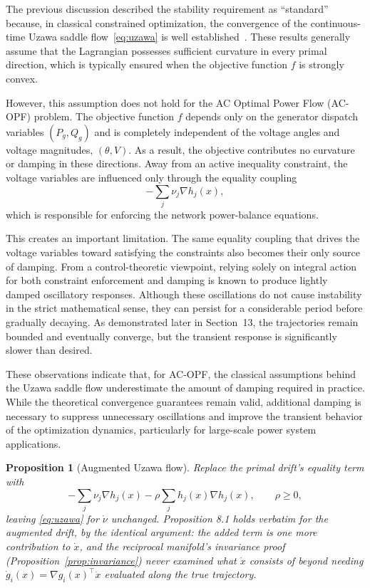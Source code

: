 \documentclass[11pt,onecolumn]{article}
\newtheorem{proposition}[theorem]{Proposition}
\theoremstyle{definition}
\theoremstyle{remark}
\begin{document}
The previous discussion described the stability requirement as ``standard'' because, in classical constrained optimization, the convergence of the continuous-time Uzawa saddle flow~\eqref{eq:uzawa} is well established~\cite{arrow1958,feijer2010}. These results generally assume that the Lagrangian possesses sufficient curvature in every primal direction, which is typically ensured when the objective function $f$ is strongly convex.

However, this assumption does not hold for the AC Optimal Power Flow (AC-OPF) problem. The objective function $f$ depends only on the generator dispatch variables $(P_g,Q_g)$ and is completely independent of the voltage angles and voltage magnitudes, $(\theta,V)$. As a result, the objective contributes no curvature or damping in these directions. Away from an active inequality constraint, the voltage variables are influenced only through the equality coupling
\[
-\sum_j \nu_j \nabla h_j(x),
\]
which is responsible for enforcing the network power-balance equations.

This creates an important limitation. The same equality coupling that drives the voltage variables toward satisfying the constraints also becomes their only source of damping. From a control-theoretic viewpoint, relying solely on integral action for both constraint enforcement and damping is known to produce lightly damped oscillatory responses. Although these oscillations do not cause instability in the strict mathematical sense, they can persist for a considerable period before gradually decaying. As demonstrated later in Section~13, the trajectories remain bounded and eventually converge, but the transient response is significantly slower than desired.

These observations indicate that, for AC-OPF, the classical assumptions behind the Uzawa saddle flow underestimate the amount of damping required in practice. While the theoretical convergence guarantees remain valid, additional damping is necessary to suppress unnecessary oscillations and improve the transient behavior of the optimization dynamics, particularly for large-scale power system applications.

\begin{proposition}[Augmented Uzawa flow] \label{prop:augmuzawa}
Replace the primal drift's equality term with
\begin{equation}
-\sum_j \nu_j \nabla h_j(x) - \rho \sum_j h_j(x) \nabla h_j(x), \qquad \rho \ge 0,
\label{eq:auguzawa}
\end{equation}
leaving \eqref{eq:uzawa} for $\dot\nu$ unchanged. Proposition 8.1 holds verbatim for the
augmented drift, by the identical argument: the added term is one more contribution to
$\dot x$, and the reciprocal manifold's invariance proof (Proposition~\ref{prop:invariance})
never examined what $\dot x$ consists of beyond needing
$\dot g_i(x) = \nabla g_i(x)^\top \dot x$ evaluated along the true trajectory.
\end{proposition}
\end{document}
